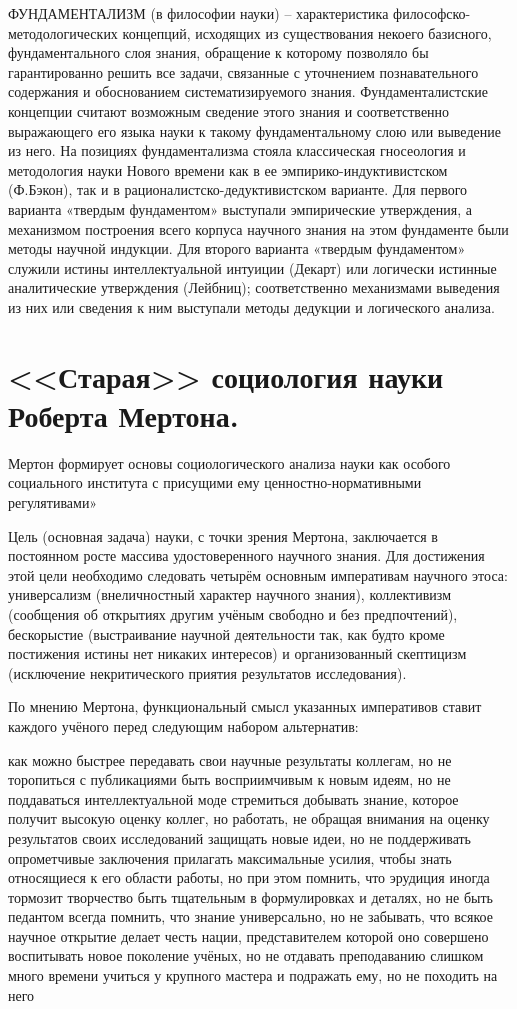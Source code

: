 \documentclass[12pt, specialist, subf, substylefile = spbu.rtx]{disser}
\begin{document}
ФУНДАМЕНТАЛИЗМ (в философии науки) – характеристика философско-методологических концепций, исходящих из существования некоего базисного, фундаментального слоя знания, обращение к которому позволяло бы гарантированно решить все задачи, связанные с уточнением познавательного содержания и обоснованием систематизируемого знания. Фундаменталистские концепции считают возможным сведение этого знания и соответственно выражающего его языка науки к такому фундаментальному слою или выведение из него. На позициях фундаментализма стояла классическая гносеология и методология науки Нового времени как в ее эмпирико-индуктивистском (Ф.Бэкон), так и в рационалистско-дедуктивистском варианте. Для первого варианта «твердым фундаментом» выступали эмпирические утверждения, а механизмом построения всего корпуса научного знания на этом фундаменте были методы научной индукции. Для второго варианта «твердым фундаментом» служили истины интеллектуальной интуиции (Декарт) или логически истинные аналитические утверждения (Лейбниц); соответственно механизмами выведения из них или сведения к ним выступали методы дедукции и логического анализа.

\section{<<Старая>> социология науки Роберта Мертона.}
Мертон формирует основы социологического анализа науки как особого социального института с присущими ему ценностно-нормативными регулятивами»

Цель (основная задача) науки, с точки зрения Мертона, заключается в постоянном росте массива удостоверенного научного знания. Для достижения этой цели необходимо следовать четырём основным императивам научного этоса: универсализм (внеличностный характер научного знания), коллективизм (сообщения об открытиях другим учёным свободно и без предпочтений), бескорыстие (выстраивание научной деятельности так, как будто кроме постижения истины нет никаких интересов) и организованный скептицизм (исключение некритического приятия результатов исследования).

По мнению Мертона, функциональный смысл указанных императивов ставит каждого учёного перед следующим набором альтернатив:

как можно быстрее передавать свои научные результаты коллегам, но не торопиться с публикациями
быть восприимчивым к новым идеям, но не поддаваться интеллектуальной моде
стремиться добывать знание, которое получит высокую оценку коллег, но работать, не обращая внимания на оценку результатов своих исследований
защищать новые идеи, но не поддерживать опрометчивые заключения
прилагать максимальные усилия, чтобы знать относящиеся к его области работы, но при этом помнить, что эрудиция иногда тормозит творчество
быть тщательным в формулировках и деталях, но не быть педантом
всегда помнить, что знание универсально, но не забывать, что всякое научное открытие делает честь нации, представителем которой оно совершено
воспитывать новое поколение учёных, но не отдавать преподаванию слишком много времени
учиться у крупного мастера и подражать ему, но не походить на него
\end{document}
